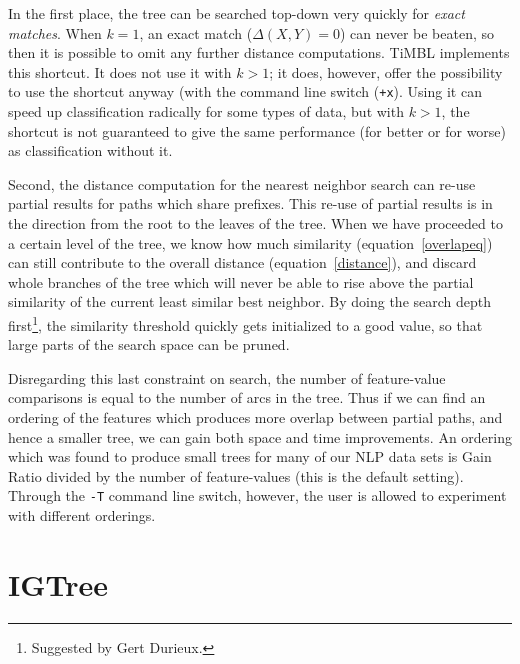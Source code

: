 \documentclass{report}
\begin{document}
In the first place, the tree can be searched top-down very quickly for
{\em exact matches}. When $k=1$, an exact match ($\Delta(X,Y)=0$) can
never be beaten, so then it is possible to omit any further distance
computations. TiMBL implements this shortcut. It does not use it with
$k>1$; it does, however, offer the possibility to use the shortcut
anyway (with the command line switch ({\tt +x}). Using it can speed up
classification radically for some types of data, but with $k>1$, the
shortcut is not guaranteed to give the same performance (for better or
for worse) as classification without it.

Second, the distance computation for the nearest neighbor search can
re-use partial results for paths which share prefixes.  This re-use of
partial results is in the direction from the root to the leaves of the
tree. When we have proceeded to a certain level of the tree, we know
how much similarity (equation~\ref{overlapeq}) can still contribute to
the overall distance (equation~\ref{distance}), and discard whole
branches of the tree which will never be able to rise above the
partial similarity of the current least similar best neighbor. By
doing the search depth first\footnote{Suggested by Gert Durieux.}, the
similarity threshold quickly gets initialized to a good value, so that
large parts of the search space can be pruned.

Disregarding this last constraint on search, the number of feature-value
comparisons is equal to the number of arcs in the tree. Thus if we can
find an ordering of the features which produces more overlap between
partial paths, and hence a smaller tree, we can gain both space and
time improvements. An ordering which was found to produce small trees
for many of our NLP data sets is Gain Ratio divided by the number of
feature-values (this is the default setting). Through the {\tt -T}
command line switch, however, the user is allowed to experiment with
different orderings.

\section{IGTree}
\label{igtree}
\end{document}
